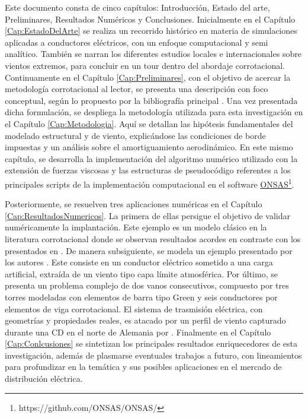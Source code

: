  Este documento consta de cinco capítulos: Introducción, Estado del arte, Preliminares, Resultados Numéricos y Conclusiones. Inicialmente en el Capítulo \ref{Cap:EstadoDelArte} se realiza un recorrido histórico en materia de simulaciones aplicadas a conductores eléctricos, con un enfoque computacional y semi analítico. También se narran los diferentes estudios locales e internacionales sobre vientos extremos, para concluir en un tour dentro del abordaje corrotacional. Continuamente en el Capítulo \ref{Cap:Preliminares}, con el objetivo de acercar la metodología corrotacional al lector, se presenta una descripción con foco conceptual, según lo propuesto por la bibliografía principal \citet{Le2014}. Una vez presentada dicha formulación, se despliega la metodología utilizada para esta investigación en el Capítulo \ref{Cap:Metodologia}. Aquí se detallan las hipótesis fundamentales del modelado estructural y de viento, explicándose las condiciones de borde impuestas y un análisis sobre el amortiguamiento aerodinámico. En este mismo capítulo, se desarrolla la implementación del algoritmo numérico utilizado con la extensión de fuerzas viscosas y las estructuras de pseudocódigo referentes a los principales scripts de la implementación computacional en el software \href{https://github.com/ONSAS/ONSAS/}{ONSAS}\footnote{https://github.com/ONSAS/ONSAS/}. 
 
 Posteriormente, se resuelven tres aplicaciones numéricas en el Capítulo \ref{Cap:ResultadosNumericos}. La primera de ellas persigue el objetivo de validar numéricamente la implantación. Este ejemplo es un modelo clásico en la literatura corrotacional donde se observan resultados acordes en contraste con los presentados en \cite{Le2014}. De manera subsiguiente, se modela un ejemplo presentado por los autores \cite{Foti2016}. Este consiste en un conductor eléctrico sometido a una carga artificial, extraída de un viento tipo capa límite atmosférica. Por último, se presenta un problema complejo de dos vanos consecutivos, compuesto por tres torres modeladas con elementos de barra tipo Green y seis conductores por elementos de viga corrotacional. El sistema de trasmisión eléctrica, con geometrías y propiedades reales, es atacado por un perfil de viento capturado durante una CD en el norte de Alemania por \cite{stengel2017measurements}. Finalmente en el Capítulo \ref{Cap:Conlcusiones} se sintetizan los principales resultados enriquecedores de esta investigación, además de plasmarse eventuales trabajos a futuro, con lineamientos para profundizar en la temática y sus posibles aplicaciones en el mercado de distribución eléctrica.